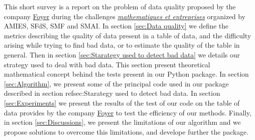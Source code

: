 \documentclass{article}
\begin{document}
This short survey is a report on the problem of data quality proposed by the company \href{ https://www.foyer.lu/en/homepage}{Foyer} during the challenges \href{https://challenge-maths.sciencesconf.org/}{\textit{mathematiques et entreprises}} organized by AMIES,  SFdS, SMF and SMAI.
In section \ref{sec:Data quality} we define the metrics describing the quality of data present in a table of data, and the difficulty arising while trying to find bad data, or to estimate the quality of the table in general. Then in section \ref{sec:Starategy used to detect bad data} we details our strategy used to deal with bad data. This section present theoretical mathematical concept behind the tests present in our Python package. In section \ref{sec:Algorithm}, we present some of the principal code used in our package described in section ref{sec:Starategy used to detect bad data}. In section \ref{sec:Experiments} we present the results of the test of our code on the table of data provides by the company \href{ https://www.foyer.lu/en/homepage}{Foyer} to test the efficiency of our methods. Finally, in section \ref{sec:Discussions}, we present the limitations of our algorithm and we propose solutions to overcome this limitations, and develope further the package.

\end{document}
